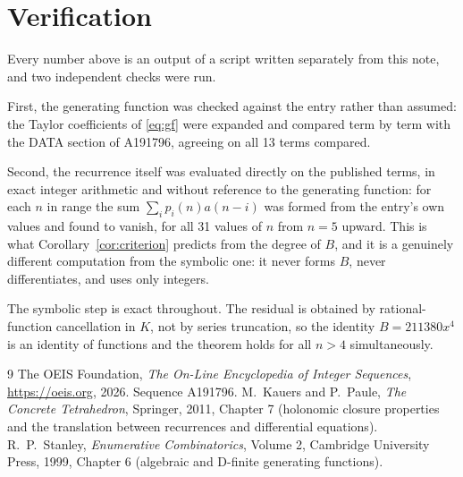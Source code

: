 \documentclass[11pt,a4paper]{article}
\theoremstyle{plain}
\theoremstyle{definition}
\begin{document}
\section{Verification}

Every number above is an output of a script written separately from this note, and two
independent checks were run.

First, the generating function was checked against the entry rather than assumed: the
Taylor coefficients of \eqref{eq:gf} were expanded and compared term by term with the DATA
section of A191796, agreeing on all 13 terms compared.

Second, the recurrence itself was evaluated directly on the published terms, in exact
integer arithmetic and without reference to the generating function: for each $n$ in range
the sum $\sum_{i}p_{i}(n)a(n-i)$ was formed from the entry's own values and found to
vanish, for all 31 values of $n$ from $n=5$ upward. This is what
Corollary~\ref{cor:criterion} predicts from the degree of $B$, and it is a genuinely
different computation from the symbolic one: it never forms $B$, never differentiates, and
uses only integers.

The symbolic step is exact throughout. The residual is obtained by rational-function
cancellation in $K$, not by series truncation, so the identity $B=211380 x^{4}$ is an
identity of functions and the theorem holds for all $n>4$ simultaneously.

\begin{thebibliography}{9}
 The OEIS Foundation, \emph{The On-Line Encyclopedia of Integer Sequences},
\url{https://oeis.org}, 2026. Sequence A191796.
 M.~Kauers and P.~Paule, \emph{The Concrete Tetrahedron}, Springer, 2011,
Chapter 7 (holonomic closure properties and the translation between recurrences and
differential equations).
 R.~P.~Stanley, \emph{Enumerative Combinatorics}, Volume 2, Cambridge
University Press, 1999, Chapter 6 (algebraic and D-finite generating functions).
\end{thebibliography}
\end{document}
